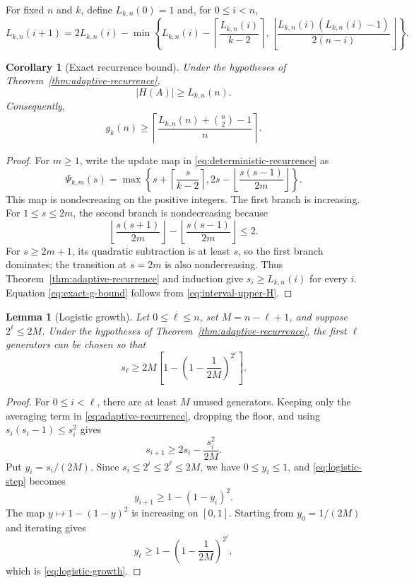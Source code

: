 \documentclass[11pt]{article}
\numberwithin{equation}{section}
\newtheorem{lemma}[theorem]{Lemma}
\newtheorem{corollary}[theorem]{Corollary}
\theoremstyle{definition}
\theoremstyle{remark}
\newcommand{\ceil}[1]{\left\lceil #1\right\rceil}
\newcommand{\floor}[1]{\left\lfloor #1\right\rfloor}
\begin{document}
\smallskip
\noindent
For fixed $n$ and $k$, define $L_{k,n}(0)=1$ and, for $0\le i<n$,
\begin{equation}\label{eq:deterministic-recurrence}
L_{k,n}(i+1)=
2L_{k,n}(i)-
\min\left\{
 L_{k,n}(i)-\ceil{\frac{L_{k,n}(i)}{k-2}},
 \floor{\frac{L_{k,n}(i)(L_{k,n}(i)-1)}{2(n-i)}}
\right\}.
\end{equation}

\begin{corollary}[Exact recurrence bound]\label{cor:exact-recurrence-bound}
Under the hypotheses of Theorem~\ref{thm:adaptive-recurrence},
\begin{equation}\label{eq:exact-H-bound}
|H(A)|\ge L_{k,n}(n).
\end{equation}
Consequently,
\begin{equation}\label{eq:exact-g-bound}
g_k(n)\ge
\ceil{\frac{L_{k,n}(n)+\binom{n}{2}-1}{n}}.
\end{equation}
\end{corollary}

\begin{proof}
For $m\ge1$, write the update map in \eqref{eq:deterministic-recurrence} as
\[
\Psi_{k,m}(s)=
\max\left\{
 s+\ceil{\frac{s}{k-2}},
 2s-\floor{\frac{s(s-1)}{2m}}
\right\}.
\]
This map is nondecreasing on the positive integers. The first branch is increasing. For $1\le s\le2m$, the second branch is nondecreasing because
\[
\floor{\frac{s(s+1)}{2m}}-
\floor{\frac{s(s-1)}{2m}}\le2.
\]
For $s\ge2m+1$, its quadratic subtraction is at least $s$, so the first branch dominates; the transition at $s=2m$ is also nondecreasing. Thus Theorem~\ref{thm:adaptive-recurrence} and induction give $s_i\ge L_{k,n}(i)$ for every $i$. Equation \eqref{eq:exact-g-bound} follows from \eqref{eq:interval-upper-H}.
\end{proof}

\begin{lemma}[Logistic growth]\label{lem:logistic-growth}
Let $0\le\ell\le n$, set $M=n-\ell+1$, and suppose $2^\ell\le2M$. Under the hypotheses of Theorem~\ref{thm:adaptive-recurrence}, the first $\ell$ generators can be chosen so that
\begin{equation}\label{eq:logistic-growth}
s_\ell\ge
2M\left[1-\left(1-\frac1{2M}\right)^{2^\ell}\right].
\end{equation}
\end{lemma}

\begin{proof}
For $0\le i<\ell$, there are at least $M$ unused generators. Keeping only the averaging term in \eqref{eq:adaptive-recurrence}, dropping the floor, and using $s_i(s_i-1)\le s_i^2$ gives
\begin{equation}\label{eq:logistic-step}
s_{i+1}\ge2s_i-\frac{s_i^2}{2M}.
\end{equation}
Put $y_i=s_i/(2M)$. Since $s_i\le2^i\le2^\ell\le2M$, we have $0\le y_i\le1$, and \eqref{eq:logistic-step} becomes
\[
y_{i+1}\ge1-(1-y_i)^2.
\]
The map $y\mapsto1-(1-y)^2$ is increasing on $[0,1]$. Starting from $y_0=1/(2M)$ and iterating gives
\[
y_\ell\ge1-\left(1-\frac1{2M}\right)^{2^\ell},
\]
which is \eqref{eq:logistic-growth}.
\end{proof}
\end{document}
